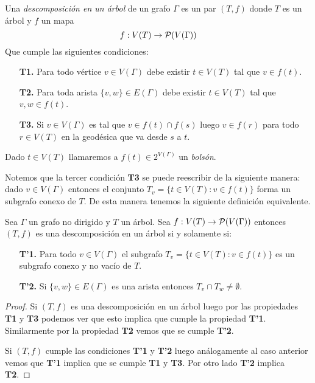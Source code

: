 \documentclass[tesis.tex]{subfiles}
\begin{document}
\begin{deff}\label{desc-arbol}
	Una \emph{descomposición en un árbol} de un grafo $\Gamma$ es un par $(T,f)$ donde
	$T$ es un árbol y $f$ un mapa 
	\[
	f: V(T) \to {\cal{P}}(V(\Gamma))
	\]
	Que cumple las siguientes condiciones:
	\begin{enumerate}
		\item[\textbf{T1.}] Para todo vértice $v \in V(\Gamma)$ debe existir $t \in V(T)$ tal que $v \in f(t)$. 
		\item[\textbf{T2.}] Para toda arista $\{v,w\} \in E(\Gamma)$ 
		debe existir $t \in V(T)$ tal que $v,w \in f(t)$.
		\item[\textbf{T3.}] Si $v \in V(\Gamma)$ es tal que $v \in f(t) \cap f(s)$ luego $v \in f(r)$ para todo $r \in V(T)$ en la geodésica que va desde $s$ a $t$.  
	\end{enumerate}
	Dado $t \in V(T)$ llamaremos a $f(t) \in 2^{V(\Gamma)}$ un \emph{bolsón}.
	 
\end{deff}
Notemos que la tercer condición \textbf{T3} se puede reescribir de la siguiente manera:
dado $v \in V(\Gamma)$ entonces el conjunto $T_{v} = \{ t \in V(T) :  v \in f(t) \}$ forma un subgrafo conexo de $T$.
\smallskip
De esta manera tenemos la siguiente definición equivalente.


\begin{prop}
	Sea $\Gamma$ un grafo no dirigido y $T$ un árbol.
	Sea $f:V(T) \to {\cal{P}}(V(\Gamma))$ entonces $(T,f)$ es una descomposición en un árbol si y solamente si:
	\begin{enumerate}
		\item[\textbf{T'1.}] Para todo $v \in V(\Gamma)$ el subgrafo $T_{v} = \{ t \in V(T) :  v \in f(t) \}$ es un subgrafo conexo y no vacío de $T$.
		\item[\textbf{T'2.}] Si $\{ v,w \} \in E(\Gamma)$ es una arista entonces $T_{v} \cap T_{w} \neq \emptyset$.
	\end{enumerate} 
\end{prop}
\begin{proof}
	Si $(T,f)$ es una descomposición en un árbol luego por las propiedades \textbf{T1} y \textbf{T3} podemos ver que esto implica que cumple la propiedad \textbf{T'1}.
	Similarmente por la propiedad \textbf{T2} vemos que se cumple \textbf{T'2}.

	Si $(T,f)$ cumple las condiciones \textbf{T'1} y \textbf{T'2} luego análogamente al caso anterior vemos que \textbf{T'1} implica que se cumple \textbf{T1} y \textbf{T3}.
	Por otro lado \textbf{T'2} implica \textbf{T2}.
\end{proof}
\end{document}
